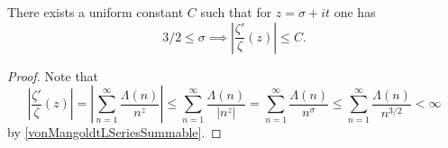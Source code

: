\begin{theorem}
\label{LogDerivZetaBdd_of_Re_ge_three_halves}
\leanok
There exists a uniform constant $C$ such that for $z=\sigma+it$ one has
    $$3/2\leq\sigma\implies\left|\frac{\zeta'}{\zeta}(z)\right|\leq C.$$
\end{theorem}
\begin{proof}
\leanok
Note that
    $$\left|\frac{\zeta'}{\zeta}(z)\right|=\left|\sum_{n=1}^\infty\frac{\Lambda(n)}{n^z}\right|\leq
      \sum_{n=1}^\infty\frac{\Lambda(n)}{|n^z|}=\sum_{n=1}^\infty\frac{\Lambda(n)}{n^\sigma}\leq
      \sum_{n=1}^\infty\frac{\Lambda(n)}{n^{3/2}}<\infty$$
    by \ref{vonMangoldtLSeriesSummable}.
\end{proof}
